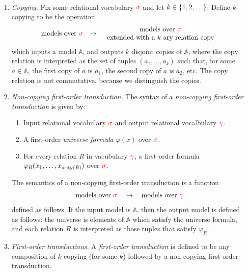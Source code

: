 \begin{definition}\label{def:fo-transduction}\ 
\begin{enumerate}
    \item \emph{Copying.} Fix some  relational vocabulary ${\color{red}{\sigma}}$ and let $k \in \{1,2,\ldots\}$. Define $k$-copying to be the operation 
    $$\begin{array}{lll}
     \text{models over ${\color{red}{\sigma}}$} & \to & 
     \begin{array}{c}
     \text{models over ${\color{red}{\sigma}}$}\\ 
     \text{extended with a $k$-ary relation $\mathrm{copy}$}
     \end{array}
    \end{array}$$
which inputs a model $\mathbb A$, and outputs $k$ disjoint copies of $\mathbb A$, where the  $\mathrm{copy}$ relation is interpreted as the set of tuples $(a_1,\ldots,a_k)$ such that, for  some $a \in \mathbb A$, the first copy of $a$ is  $a_1$, the second copy of $a$ is $a_2$, etc. The $\mathrm{copy}$ relation  is not commutative, because we distinguish the copies.
\item    \emph{Non-copying first-order transduction.} The syntax of a \emph{non-copying first-order transduction}  is given by:
\begin{enumerate}
    \item Input relational vocabulary ${\color{red}{\sigma}}$ and output relational vocalbulary ${\color{red}{\gamma}}$.
    \item A first-order \emph{universe formula} $\varphi(x)$ over ${\color{red}{\sigma}}$.
    \item For every relation $R$ in vacubulary ${\color{red}{\gamma}}$, a first-order  formula $\varphi_R(x_1,\ldots,x_{\mathrm{arity}(R)})$ over ${\color{red}{\sigma}}$.
\end{enumerate}
The semantics of a non-copying first-order transduction is  a function
\begin{align*}
    \text{models over ${\color{red}{\sigma}}$} \quad \to \quad \text{models over ${\color{red}{\gamma}}$}
\end{align*}
defined as follows. If the input model is $\mathbb A$, then the output model is defined as follows: the universe is elements of $\mathbb A$ which satisfy the universe formula, and each relation $R$ is interpreted as those tuples that satisfy $\varphi_R$. 
\item \emph{First-order transductions.} A \emph{first-order transduction} is defined to be any  composition of $k$-copying (for some $k$) followed by a non-copying first-order transduction. 
 \end{enumerate}
\end{definition}



